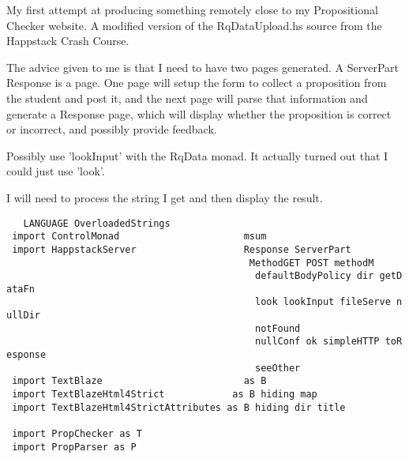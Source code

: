 \documentclass{article}
\begin{document}
My first attempt at producing something remotely close to my Propositional
Checker website. A modified version of the RqDataUpload.hs source from the
Happstack Crash Course.

The advice given to me is that I need to have two pages generated. A
ServerPart Response is a page. One page will setup the form to collect a
proposition from the student and post it, and the next page will parse that
information and generate a Response page, which will display whether the
proposition is correct or incorrect, and possibly provide feedback.

Possibly use 'lookInput' with the RqData monad. It actually turned out that I
could just use 'look'.

I will need to process the string I get and then display the result.

\begin{tabbing}\tt
~~LANGUAGE~OverloadedStrings~\\
\tt ~import~ControlMonad~~~~~~~~~~~~~~~~~~~~~~msum\\
\tt ~import~HappstackServer~~~~~~~~~~~~~~~~~~~Response~ServerPart~\\
\tt ~~~~~~~~~~~~~~~~~~~~~~~~~~~~~~~~~~~~~~~~~~~MethodGET~POST~methodM\\
\tt ~~~~~~~~~~~~~~~~~~~~~~~~~~~~~~~~~~~~~~~~~~~~defaultBodyPolicy~dir~getDataFn\\
\tt ~~~~~~~~~~~~~~~~~~~~~~~~~~~~~~~~~~~~~~~~~~~~look~lookInput~fileServe~nullDir\\
\tt ~~~~~~~~~~~~~~~~~~~~~~~~~~~~~~~~~~~~~~~~~~~~notFound\\
\tt ~~~~~~~~~~~~~~~~~~~~~~~~~~~~~~~~~~~~~~~~~~~~nullConf~ok~simpleHTTP~toResponse\\
\tt ~~~~~~~~~~~~~~~~~~~~~~~~~~~~~~~~~~~~~~~~~~~~seeOther\\
\tt ~import~TextBlaze~~~~~~~~~~~~~~~~~~~~~~~~~as~B\\
\tt ~import~TextBlazeHtml4Strict~~~~~~~~~~~~as~B~hiding~map\\
\tt ~import~TextBlazeHtml4StrictAttributes~as~B~hiding~dir~title~\\
\tt ~\\
\tt ~import~PropChecker~as~T\\
\tt ~import~PropParser~as~P
\end{tabbing}
\end{document}

